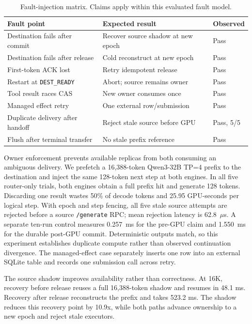 \begin{table}[t]
\centering
\small
\caption{Fault-injection matrix. Claims apply within this evaluated fault model.}
\label{tab:faults}
\begin{tabular}{lll}
\toprule
Fault point & Expected result & Observed \\
\midrule
Destination fails after commit & Recover source shadow at new epoch & Pass \\
Destination fails after release & Cold reconstruct at new epoch & Pass \\
First-token ACK lost & Retry idempotent release & Pass \\
Restart at \texttt{DEST\_READY} & Abort; source remains owner & Pass \\
Tool result races CAS & New owner consumes once & Pass \\
Managed effect retry & One external row/submission & Pass \\
Duplicate delivery after handoff & Reject stale source before GPU & Pass, 5/5 \\
Flush after terminal transfer & No stale prefix reference & Pass \\
\bottomrule
\end{tabular}
\end{table}

Owner enforcement prevents available replicas from both consuming an ambiguous delivery. We prefetch a 16,388-token Qwen3-32B TP=4 prefix to the destination and inject the same 128-token next step at both engines. In all five router-only trials, both engines obtain a full prefix hit and generate 128 tokens. Discarding one result wastes 50\% of decode tokens and 25.95 GPU-seconds per logical step. With epoch and step fencing, all five stale source attempts are rejected before a source \texttt{/generate} RPC; mean rejection latency is 62.8~$\mu$s. A separate ten-run control measures 0.257~ms for the pre-GPU claim and 1.550~ms for the durable post-GPU commit. Deterministic outputs match, so this experiment establishes duplicate compute rather than observed continuation divergence. The managed-effect case separately inserts one row into an external SQLite table and records one submission call across retry.

The source shadow improves availability rather than correctness. At 16K, recovery before release reuses a full 16,388-token shadow and resumes in 48.1 ms. Recovery after release reconstructs the prefix and takes 523.2 ms. The shadow reduces this recovery point by 10.9x, while both paths advance ownership to a new epoch and reject stale executors.


